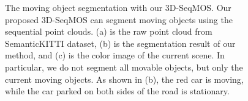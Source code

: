\documentclass[lettersize,journal]{IEEEtran}
\begin{document}
\begin{figure}[t]
\centering
{}
\hfil
{}
\hfil
{}
\caption{The moving object segmentation with our 3D-SeqMOS. Our proposed 3D-SeqMOS can segment moving objects using the sequential point clouds. (a) is the raw point cloud from SemanticKITTI dataset, (b) is the segmentation result of our method, and (c) is the color image of the current scene. In particular, we do not segment all movable objects, but only the current moving objects. As shown in (b), the red car is moving, while the car parked on both sides of the road is stationary.}
\label{fig_1}
\end{figure}
\end{document}
